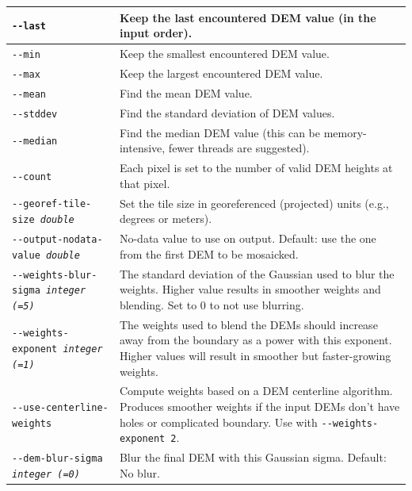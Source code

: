 \begin{longtable}{|l|p{10cm}|}
\texttt{-\/-last}
& Keep the last encountered DEM value (in the input order).
\\ \hline

\texttt{-\/-min}
& Keep the smallest encountered DEM value.
\\ \hline

\texttt{-\/-max}
& Keep the largest encountered DEM value.
\\ \hline

\texttt{-\/-mean}
& Find the mean DEM value.
\\ \hline

\texttt{-\/-stddev}
& Find the standard deviation of DEM values.
\\ \hline

\texttt{-\/-median}
& Find the median DEM value (this can be memory-intensive, fewer threads are suggested).
\\ \hline

\texttt{-\/-count}
& Each pixel is set to the number of valid DEM heights at that pixel.
\\ \hline

\texttt{-\/-georef-tile-size \textit{double}} &
Set the tile size in georeferenced (projected) units (e.g., degrees or meters).
\\ \hline
\texttt{-\/-output-nodata-value \textit{double}} &
No-data value to use on output. Default: use the one from the first DEM to be mosaicked.
\\ \hline

\texttt{-\/-weights-blur-sigma \textit{integer (=5)} } &
The standard deviation of the Gaussian used to blur the weights. Higher value results in smoother weights and blending. Set to 0 to not use blurring.
\\ \hline

\texttt{-\/-weights-exponent \textit{integer (=1)} } &
The weights used to blend the DEMs should increase away from the boundary as a power with this exponent. Higher values will result in smoother but faster-growing weights.
\\ \hline

\texttt{-\/-use-centerline-weights} &
Compute weights based on a DEM centerline algorithm. Produces smoother weights if the input DEMs don't have holes or complicated boundary. Use with \texttt{-\/-weights-exponent 2}.
\\ \hline

\texttt{-\/-dem-blur-sigma \textit{integer (=0)} } &
Blur the final DEM with this Gaussian sigma. Default: No blur.
\\ \hline


\end{longtable}
